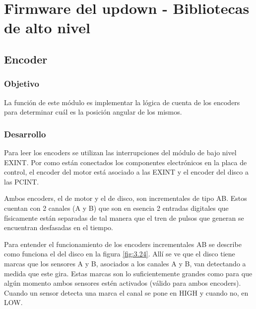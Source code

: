 \section{Firmware del updown - Bibliotecas de alto nivel} \label{sec:\thesection}

\subsection{Encoder}
\subsubsection{Objetivo}
La función de este módulo es implementar la lógica de cuenta de los encoders para determinar cuál es la posición angular de los mismos.

\subsubsection{Desarrollo}
Para leer los encoders se utilizan las interrupciones del módulo de bajo nivel EXINT. Por como están conectados los componentes electrónicos en la placa de control, el encoder del motor está asociado a las EXINT y el encoder del disco a las PCINT.

Ambos encoders, el de motor y el de disco, son incrementales de tipo AB. Estos cuentan con 2 canales (A y B) que son en esencia 2 entradas digitales que físicamente están separadas de tal manera que el tren de pulsos que generan se encuentran desfasadas en el tiempo. 

Para entender el funcionamiento de los encoders incrementales AB se describe como funciona el del disco en la figura \ref{fig:3.24}. Allí se ve que el disco tiene marcas que los sensores A y B, asociados a los canales A y B, van detectando a medida que este gira. Estas marcas son lo suficientemente grandes como para que algún momento ambos sensores estén activados (válido para ambos encoders). Cuando un sensor detecta una marca el canal se pone en HIGH y cuando no, en LOW.

